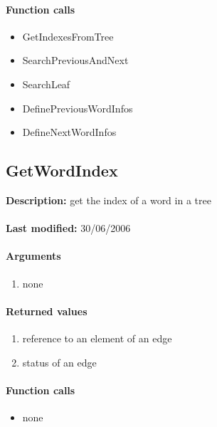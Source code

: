 \paragraph{Function calls}
\begin{itemize}
\item GetIndexesFromTree
\item SearchPreviousAndNext
\item SearchLeaf
\item DefinePreviousWordInfos
\item DefineNextWordInfos
\end{itemize}

\subsection{GetWordIndex}
\textbf{Description:} get the index of a word in a tree\\
\\\textbf{Last modified:} 30/06/2006

\paragraph{Arguments}
\begin{enumerate}
\item none
\end{enumerate}

\paragraph{Returned values}
\begin{enumerate}
\item reference to an element of an edge
\item status of an edge
\end{enumerate}

\paragraph{Function calls}
\begin{itemize}
\item none
\end{itemize}

